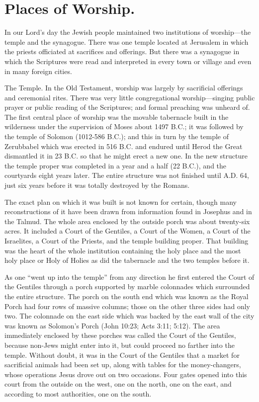 \section{Places of Worship.}

In our Lord's day the Jewish people maintained two institutions of worship---the temple and the synagogue. There was one temple located at Jerusalem in which the priests officiated at sacrifices and offerings. But there was a synagogue in which the Scriptures were read and interpreted in every town or village and even in many foreign cities.

The Temple. In the Old Testament, worship was largely by sacrificial offerings and ceremonial rites. There was very little congregational worship---singing public prayer or public reading of the Scriptures; and formal preaching was unheard of. The first central place of worship was the movable tabernacle built in the wilderness under the supervision of Moses about 1497 B.C.; it was followed by the temple of Solomon (1012-586 B.C.); and this in turn by the temple of Zerubbabel which was erected in 516 B.C. and endured until Herod the Great dismantled it in 23 B.C. so that he might erect a new one. In the new structure the temple proper was completed in a year and a half (22 B.C.), and the courtyards eight years later. The entire structure was not finished until A.D. 64, just six years before it was totally destroyed by the Romans.

The exact plan on which it was built is not known for certain, though many reconstructions of it have been drawn from information found in Josephus and in the Talmud. The whole area enclosed by the outside porch was about twenty-six acres. It included a Court of the Gentiles, a Court of the Women, a Court of the Israelites, a Court of the Priests, and the temple building proper. That building was the heart of the whole institution containing the holy place and the most holy place or Holy of Holies as did the tabernacle and the two temples before it.

As one ``went up into the temple'' from any direction he first entered the Court of the Gentiles through a porch supported by marble colonnades which surrounded the entire structure. The porch on the south end which was known as the Royal Porch had four rows of massive columns; those on the other three sides had only two. The colonnade on the east side which was backed by the east wall of the city was known as Solomon's Porch (John 10:23; Acts 3:11; 5:12). The area immediately enclosed by these porches was called the Court of the Gentiles, because non-Jews might enter into it, but could proceed no farther into the temple. Without doubt, it was in the Court of the Gentiles that a market for sacrificial animals had been set up, along with tables for the money-changers, whose operations Jesus drove out on two occasions. Four gates opened into this court from the outside on the west, one on the north, one on the east, and according to most authorities, one on the south.

